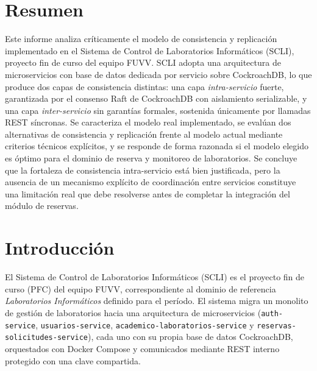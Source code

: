 \documentclass[12pt,letterpaper]{article}
\begin{document}
\section*{Resumen}
Este informe analiza cr\'iticamente el modelo de consistencia y replicaci\'on
implementado en el Sistema de Control de Laboratorios Inform\'aticos (SCLI),
proyecto fin de curso del equipo FUVV. SCLI adopta una arquitectura de
microservicios con base de datos dedicada por servicio sobre CockroachDB,
lo que produce dos capas de consistencia distintas: una capa
\emph{intra-servicio} fuerte, garantizada por el consenso Raft de
CockroachDB con aislamiento serializable, y una capa \emph{inter-servicio}
sin garant\'ias formales, sostenida \'unicamente por llamadas REST
s\'incronas. Se caracteriza el modelo real implementado, se eval\'uan dos
alternativas de consistencia y replicaci\'on frente al modelo actual
mediante criterios t\'ecnicos expl\'icitos, y se responde de forma razonada
si el modelo elegido es \'optimo para el dominio de reserva y monitoreo de
laboratorios. Se concluye que la fortaleza de consistencia intra-servicio
est\'a bien justificada, pero la ausencia de un mecanismo expl\'icito de
coordinaci\'on entre servicios constituye una limitaci\'on real que debe
resolverse antes de completar la integraci\'on del m\'odulo de reservas.

\vspace{0.5cm}

\section{Introducci\'on}

El Sistema de Control de Laboratorios Inform\'aticos (SCLI) es el proyecto
fin de curso (PFC) del equipo FUVV, correspondiente al dominio de referencia
\emph{Laboratorios Inform\'aticos} definido para el per\'iodo. El sistema
migra un monolito de gesti\'on de laboratorios hacia una arquitectura de
microservicios (\texttt{auth-service}, \texttt{usuarios-service},
\texttt{academico-laboratorios-service} y
\texttt{reservas-solicitudes-service}), cada uno con su propia base de
datos CockroachDB, orquestados con Docker Compose y comunicados mediante
REST interno protegido con una clave compartida.
\end{document}
